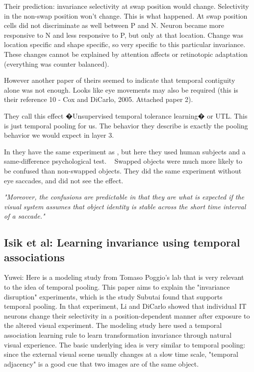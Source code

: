 \documentclass{article} %
\begin{document}
Their prediction: invariance selectivity at swap position would change.
Selectivity in the non-swap position won't change.  This is what happened. At
swap position cells did not discriminate as well between P and N. Neuron became
more responsive to N and less responsive to P, but only at that location. Change
was location specific and shape specific, so very specific to this particular
invariance. These changes cannot be explained by attention affects or
retinotopic adaptation (everything was counter balanced).

However another paper of theirs seemed to indicate that temporal contiguity
alone was not enough. Looks like eye movements may also be required (this is
their reference 10 - Cox and DiCarlo, 2005. Attached paper 2).

They call this effect �Unsupervised temporal tolerance learning� or UTL. This is
just temporal pooling for us.  The behavior they describe is exactly the pooling
behavior we would expect in layer 3.

In \cite{Cox2005} they have the same experiment as \cite{Li2008}, but
here they used human subjects and a same-difference psychological test.  
Swapped objects were much more likely to be confused than non-swapped objects.
They did the same experiment without eye saccades, and did not see the effect. 

\emph{"Moreover, the confusions are predictable in that they are what is
expected if the visual system assumes that object identity is stable across the short time
interval of a saccade."}


\subsection{Isik et al: Learning invariance using temporal associations}

Yuwei: Here \cite{Isik2012} is a modeling study from Tomaso Poggio's lab that
 is very
relevant to the idea of temporal pooling. This paper aims to explain the
"invariance disruption" experiments, which is the study Subutai found that
supports temporal pooling. In that experiment, Li and DiCarlo
\cite{Li2008} showed that
individual IT neurons change their selectivity in a position-dependent manner
after exposure to the altered visual experiment. The modeling study here used a
temporal association learning rule to learn transformation invariance through
natural visual experience. The basic underlying idea is very similar to temporal
pooling: since the external visual scene usually changes at a slow time scale,
"temporal adjacency" is a good cue that two images are of the same object.
\end{document}
